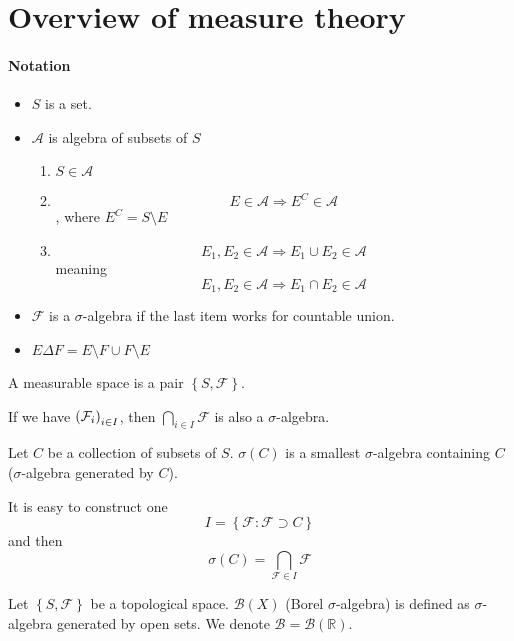 \section{Overview of measure theory}
\paragraph{Notation}
\begin{itemize}
	\item $S$ is a set.
	\item $\mathcal{A}$ is algebra of subsets of $S$
	\begin{enumerate}
		\item $S\in \mathcal{A}$
		\item $$E\in \mathcal{A} \Rightarrow E^C\in \mathcal{A}$$, where $E^C = S \setminus E$
		\item $$E_1, E_2 \in \mathcal{A} \Rightarrow E_1 \cup E_2 \in \mathcal{A}$$
		meaning
		$$E_1, E_2 \in \mathcal{A} \Rightarrow E_1 \cap E_2 \in \mathcal{A}$$
	\end{enumerate}
\item $\mathcal{F}$ is a $\sigma$-algebra if the last item works for countable union.
\item $E\Delta F = E\setminus F \cup F \setminus E$ 
\end{itemize}

\begin{definition}
	A measurable space is a pair $\left\{S,\mathcal{F}\right\}$.
\end{definition}

\begin{prop}
	If we have $\qty(\mathcal{F}_i)_{i\in I}$, then $\bigcap_{i\in I} \mathcal{F} $ is also a $\sigma$-algebra.
\end{prop}

\begin{definition}
	Let $C$ be a collection of subsets of $S$. $\sigma(C)$ is a smallest $\sigma$-algebra containing $C$ ($\sigma$-algebra generated by $C$).
	
	It is easy to construct one
	$$I = \left\{ \mathcal{F} :\mathcal{F} \supset C \right\}$$
	and then
	$$\sigma(C) = \bigcap_{\mathcal{F}\in I} \mathcal{F}$$
\end{definition}

\begin{definition}
	Let $\left\{S,\mathcal{F}\right\}$ be a topological space. $\mathcal{B}(X)$ (Borel $\sigma$-algebra) is defined as $\sigma$-algebra generated by open sets. We denote
	$\mathcal{B} = \mathcal{B}(\mathbb{R})$.
\end{definition}
